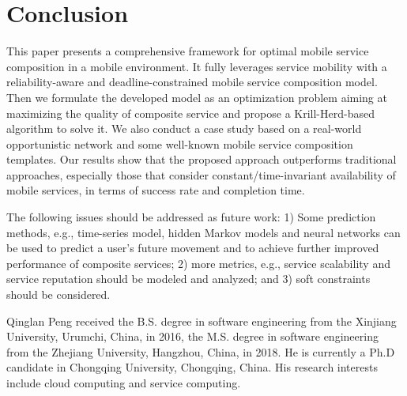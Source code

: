 \documentclass[journal]{IEEEtran}
\begin{document}
\section{Conclusion}
This paper presents a comprehensive framework for optimal mobile service composition in a mobile environment. It fully leverages service mobility with a reliability-aware and deadline-constrained mobile service composition model. Then we formulate the developed model as an optimization problem aiming at maximizing the quality of composite service and propose a Krill-Herd-based algorithm to solve it. We also conduct a case study based on a real-world opportunistic network and some well-known mobile service composition templates. Our results show that the proposed approach outperforms traditional approaches, especially those that consider constant/time-invariant availability of mobile services, in terms of success rate and completion time.

The following issues should be addressed as future work: 1) Some prediction methods, e.g., time-series model, hidden Markov models and neural networks can be used to predict a user's future movement and to achieve further improved performance of composite services; 2) more metrics, e.g., service scalability and service reputation should be modeled and  analyzed; and 3) soft constraints should be considered. 



\ifCLASSOPTIONcaptionsoff
  \newpage
\fi







\begin{IEEEbiography}{Qinglan Peng}
received the B.S. degree in software engineering from the Xinjiang University, Urumchi, China, in 2016, the M.S. degree in software engineering from the Zhejiang University, Hangzhou, China, in 2018. He is currently a Ph.D candidate in Chongqing University, Chongqing, China. His research interests include cloud computing and service computing.
\end{IEEEbiography}
\end{document}
